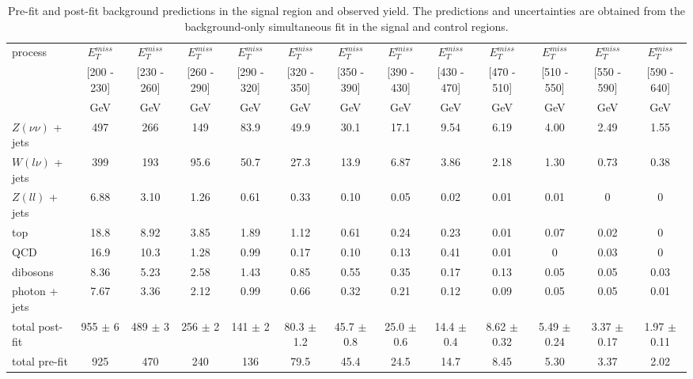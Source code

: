 \begin{landscape}

\begin{table}[p]
  \centering
\caption{Pre-fit and post-fit background predictions in the signal region and observed yield. The predictions and uncertainties are obtained from the background-only simultaneous fit in the signal and control regions.}
\label{tab:monojet_yields_1}
\scriptsize
\begin{subtable}{}
\renewcommand{\arraystretch}{1.3}
\begin{tabular}{| l | c | c | c | c | c | c | c | c | c | c | c | c |}
\hline
\multirow{3}{*}{process} &  $E_T^{miss}$ &  $E_T^{miss}$ &  $E_T^{miss}$ &  $E_T^{miss}$ &  $E_T^{miss}$ &  $E_T^{miss}$ &  $E_T^{miss}$ &  $E_T^{miss}$ &  $E_T^{miss}$ &  $E_T^{miss}$ &  $E_T^{miss}$ &  $E_T^{miss}$  \\
 & [200 - 230] & [230 - 260] & [260 - 290] & [290 - 320] & [320 - 350] & [350 - 390] & [390 - 430] & [430 - 470] & [470 - 510] & [510 - 550] & [550 - 590] & [590 - 640]  \\
 & GeV & GeV & GeV & GeV & GeV & GeV & GeV & GeV & GeV & GeV & GeV & GeV \\
\hline
  $Z(\nu\nu)$ + jets & 497 & 266 & 149 & 83.9 & 49.9 & 30.1 & 17.1 & 9.54 & 6.19 & 4.00 & 2.49 & 1.55\\
  $W(l\nu)$ + jets & 399 & 193 & 95.6 & 50.7 & 27.3 & 13.9 & 6.87 & 3.86 & 2.18 & 1.30 & 0.73 & 0.38\\
  $Z(ll)$ + jets & 6.88 & 3.10 & 1.26 & 0.61 & 0.33 & 0.10 & 0.05 & 0.02 & 0.01 & 0.01 & 0 & 0 \\
  top & 18.8 & 8.92 & 3.85 & 1.89 & 1.12 & 0.61 & 0.24 & 0.23 & 0.01 & 0.07 & 0.02 & 0\\
  QCD & 16.9 & 10.3 & 1.28 & 0.99 & 0.17 & 0.10 & 0.13 & 0.41 & 0.01 & 0 & 0.03 & 0\\
  dibosons & 8.36 & 5.23 & 2.58 & 1.43 & 0.85 & 0.55 & 0.35 & 0.17 & 0.13 & 0.05 & 0.05 & 0.03\\
  photon + jets & 7.67 & 3.36 & 2.12 & 0.99 & 0.66 & 0.32 & 0.21 & 0.12 & 0.09 & 0.05 & 0.05 & 0.01 \\
\hline
  total post-fit & 955 $\pm$ 6 & 489 $\pm$ 3 & 256 $\pm$ 2 & 141 $\pm$ 2 & 80.3 $\pm$ 1.2 & 45.7 $\pm$ 0.8 & 25.0 $\pm$ 0.6 & 14.4 $\pm$ 0.4 & 8.62 $\pm$ 0.32 & 5.49 $\pm$ 0.24 & 3.37 $\pm$ 0.17 & 1.97 $\pm$ 0.11 \\
\hline
  total pre-fit & 925 & 470 & 240 & 136 & 79.5 & 45.4 & 24.5 & 14.7 & 8.45 & 5.30 & 3.37 & 2.02\\

\end{tabular}
\end{subtable}
\end{table}
\end{landscape}
